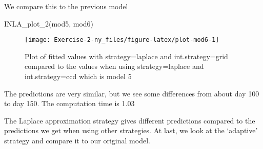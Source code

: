\documentclass[
]{article}
\newenvironment{Shaded}{\begin{snugshade}}{\end{snugshade}}
\newcommand{\AttributeTok}[1]{\textcolor[rgb]{0.77,0.63,0.00}{#1}}
\newcommand{\FunctionTok}[1]{\textcolor[rgb]{0.00,0.00,0.00}{#1}}
\newcommand{\NormalTok}[1]{#1}
\newcommand{\OtherTok}[1]{\textcolor[rgb]{0.56,0.35,0.01}{#1}}
\newcommand{\SpecialCharTok}[1]{\textcolor[rgb]{0.00,0.00,0.00}{#1}}
\newcommand{\StringTok}[1]{\textcolor[rgb]{0.31,0.60,0.02}{#1}}
\begin{document}
\begin{Shaded}
\end{Shaded}

We compare this to the previous model

\begin{Shaded}
\begin{Highlighting}[]
\FunctionTok{INLA\_plot\_2}\NormalTok{(mod5, mod6)}
\end{Highlighting}
\end{Shaded}

\begin{figure}

{\centering \texttt{[image: Exercise-2-ny\_files/figure-latex/plot-mod6-1]} 

}

\caption{Plot of fitted values with strategy=laplace and int.strategy=grid compared to the values when using strategy=laplace and int.strategy=ccd which is model 5}\label{fig:plot-mod6}
\end{figure}

The predictions are very similar, but we see some differences from about day 100 to day 150. The computation time is 1.03

The Laplace approximation strategy gives different predictions compared to the predictions we get when using other strategies. At last, we look at the `adaptive' strategy and compare it to our original model.

\begin{Shaded}
\end{Shaded}
\end{document}

